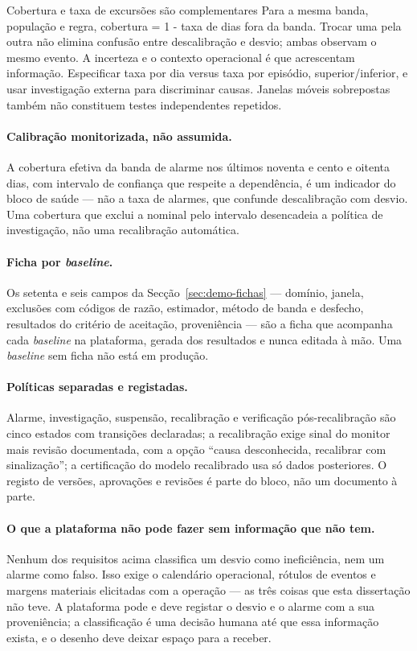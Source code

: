 {Cobertura e taxa de excursões são complementares}
{Para a mesma banda, população e regra, cobertura = 1 - taxa de dias
fora da banda. Trocar uma pela outra não elimina confusão entre
descalibração e desvio; ambas observam o mesmo evento. A incerteza e o
contexto operacional é que acrescentam informação. Especificar taxa
por dia versus taxa por episódio, superior/inferior, e usar investigação
externa para discriminar causas. Janelas móveis sobrepostas também
não constituem testes independentes repetidos.}%
\paragraph{Calibração monitorizada, não assumida.} A cobertura efetiva da
banda de alarme nos últimos noventa e cento e oitenta dias, com intervalo de
confiança que respeite a dependência, é um indicador do bloco de saúde ---
não a taxa de alarmes, que confunde descalibração com desvio. Uma cobertura
que exclui a nominal pelo intervalo desencadeia a política de investigação,
não uma recalibração automática.

\paragraph{Ficha por \emph{baseline}.} Os setenta e seis campos da
Secção~\ref{sec:demo-fichas} --- domínio, janela, exclusões com códigos de
razão, estimador, método de banda e desfecho, resultados do critério de
aceitação, proveniência --- são a ficha que acompanha cada \emph{baseline}
na plataforma, gerada dos resultados e nunca editada à mão. Uma
\emph{baseline} sem ficha não está em produção.

\paragraph{Políticas separadas e registadas.} Alarme, investigação, suspensão,
recalibração e verificação pós-recalibração são cinco estados com transições
declaradas; a recalibração exige sinal do monitor mais revisão documentada,
com a opção ``causa desconhecida, recalibrar com sinalização''; a
certificação do modelo recalibrado usa só dados posteriores. O registo de
versões, aprovações e revisões é parte do bloco, não um documento à parte.

\paragraph{O que a plataforma não pode fazer sem informação que não tem.}
Nenhum dos requisitos acima classifica um desvio como ineficiência, nem um
alarme como falso. Isso exige o calendário operacional, rótulos de eventos e
margens materiais elicitadas com a operação --- as três coisas que esta
dissertação não teve. A plataforma pode e deve registar o desvio e o alarme
com a sua proveniência; a classificação é uma decisão humana até que essa
informação exista, e o desenho deve deixar espaço para a receber.

